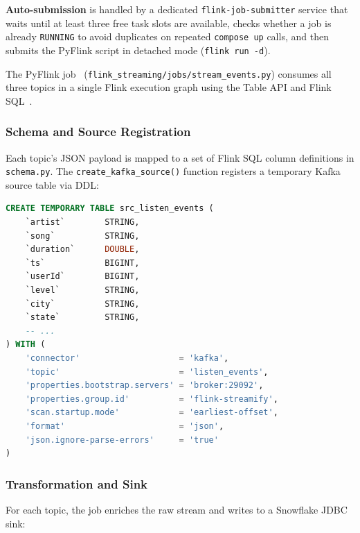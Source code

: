 \textbf{Auto-submission} is handled by a dedicated \texttt{flink-job-submitter} service that
waits until at least three free task slots are available, checks whether a job is already
\texttt{RUNNING} to avoid duplicates on repeated \texttt{compose up} calls, and then submits
the PyFlink script in detached mode (\texttt{flink run -d}).

The PyFlink job~\cite{flink_pyflink} (\texttt{flink\_streaming/jobs/stream\_events.py}) consumes all three topics in
a single Flink execution graph using the Table API and Flink SQL~\cite{flink_kafka_connector}.

\subsubsection{Schema and Source Registration}

Each topic's JSON payload is mapped to a set of Flink SQL column definitions in \texttt{schema.py}.
The \texttt{create\_kafka\_source()} function registers a temporary Kafka source table via DDL:

\begin{lstlisting}[language=SQL, caption={Generated Kafka source DDL for \texttt{listen\_events}.}]
CREATE TEMPORARY TABLE src_listen_events (
    `artist`        STRING,
    `song`          STRING,
    `duration`      DOUBLE,
    `ts`            BIGINT,
    `userId`        BIGINT,
    `level`         STRING,
    `city`          STRING,
    `state`         STRING,
    -- ...
) WITH (
    'connector'                    = 'kafka',
    'topic'                        = 'listen_events',
    'properties.bootstrap.servers' = 'broker:29092',
    'properties.group.id'          = 'flink-streamify',
    'scan.startup.mode'            = 'earliest-offset',
    'format'                       = 'json',
    'json.ignore-parse-errors'     = 'true'
)
\end{lstlisting}

\subsubsection{Transformation and Sink}

For each topic, the job enriches the raw stream and writes to a Snowflake JDBC sink:

